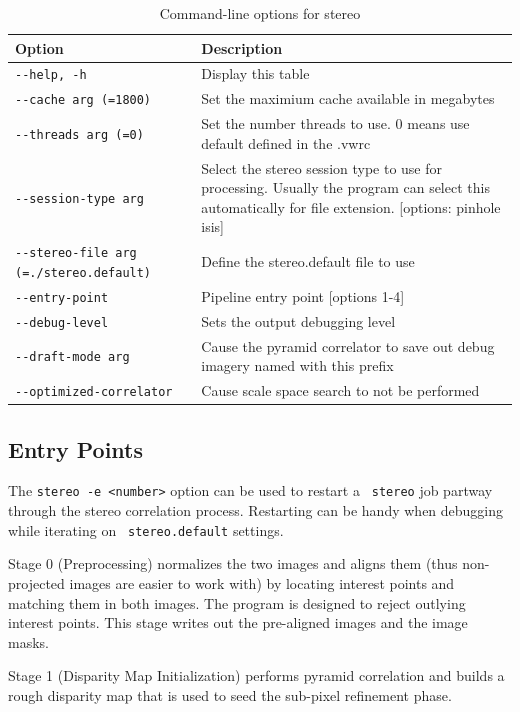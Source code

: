\begin{longtable}{|l|p{10cm}|}
\caption{Command-line options for stereo}
\label{tbl:stereo}
\endfirsthead
\endhead
\endfoot
\endlastfoot
\hline
Option & Description \\ \hline \hline
\verb#--help, -h# & Display this table\\ \hline
\verb#--cache arg (=1800)# & Set the maximium cache available in megabytes\\ \hline
\verb#--threads arg (=0)# & Set the number threads to use. 0 means use default defined in the .vwrc\\ \hline
\verb#--session-type arg# & Select the stereo session type to use for processing. Usually the program can select this automatically for file extension. [options: pinhole isis]\\ \hline
\verb#--stereo-file arg (=./stereo.default)# & Define the stereo.default file to use\\ \hline
\verb#--entry-point# & Pipeline entry point [options 1-4]\\ \hline
\verb#--debug-level# & Sets the output debugging level\\ \hline
\verb#--draft-mode arg# & Cause the pyramid correlator to save out debug imagery named with this prefix\\ \hline
\verb#--optimized-correlator# & Cause scale space search to not be performed\\ \hline
\end{longtable}

\subsection{Entry Points}
\label{entrypoints}

The {\tt stereo -e <number>} option can be used to restart a {\tt
  stereo} job partway through the stereo correlation process.
Restarting can be handy when debugging while iterating on {\tt
  stereo.default} settings.

Stage 0 (Preprocessing) normalizes the two images and aligns them
(thus non-projected images are easier to work with) by locating
interest points and matching them in both images. The program is
designed to reject outlying interest points.  This stage writes out
the pre-aligned images and the image masks.

Stage 1 (Disparity Map Initialization) performs pyramid correlation and builds a rough disparity map that is used to seed the sub-pixel refinement phase.

